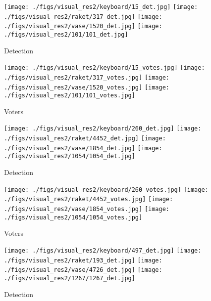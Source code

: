 \documentclass[runningheads]{llncs}
\begin{document}
\begin{figure*}
\captionsetup[subfigure]{labelformat=empty}
\centering
\begin{subfigure}[b]{0.16\textwidth}
   \caption{Detection}
   \texttt{[image: ./figs/visual\_res2/keyboard/15\_det.jpg]}
   \texttt{[image: ./figs/visual\_res2/raket/317\_det.jpg]}
   \texttt{[image: ./figs/visual\_res2/vase/1520\_det.jpg]}
   \texttt{[image: ./figs/visual\_res2/101/101\_det.jpg]}


\end{subfigure}
\begin{subfigure}[b]{0.16\textwidth}
   \caption{Voters}
   \texttt{[image: ./figs/visual\_res2/keyboard/15\_votes.jpg]}
\texttt{[image: ./figs/visual\_res2/raket/317\_votes.jpg]}
  \texttt{[image: ./figs/visual\_res2/vase/1520\_votes.jpg]}
   \texttt{[image: ./figs/visual\_res2/101/101\_votes.jpg]}
\end{subfigure}
\begin{subfigure}[b]{0.16\textwidth}
   \caption{Detection}
   \texttt{[image: ./figs/visual\_res2/keyboard/260\_det.jpg]}
   \texttt{[image: ./figs/visual\_res2/raket/4452\_det.jpg]}
   \texttt{[image: ./figs/visual\_res2/vase/1854\_det.jpg]}
   \texttt{[image: ./figs/visual\_res2/1054/1054\_det.jpg]}
\end{subfigure}
\begin{subfigure}[b]{0.16\textwidth}
   \caption{Voters}
   \texttt{[image: ./figs/visual\_res2/keyboard/260\_votes.jpg]}
\texttt{[image: ./figs/visual\_res2/raket/4452\_votes.jpg]}
  \texttt{[image: ./figs/visual\_res2/vase/1854\_votes.jpg]}
  \texttt{[image: ./figs/visual\_res2/1054/1054\_votes.jpg]}
\end{subfigure}
\begin{subfigure}[b]{0.16\textwidth}
   \caption{Detection}
   \texttt{[image: ./figs/visual\_res2/keyboard/497\_det.jpg]}
   \texttt{[image: ./figs/visual\_res2/raket/193\_det.jpg]}
   \texttt{[image: ./figs/visual\_res2/vase/4726\_det.jpg]}
  \texttt{[image: ./figs/visual\_res2/1267/1267\_det.jpg]}
\end{subfigure}
\begin{subfigure}[b]{0.16\textwidth}

\end{subfigure}
\end{figure*}
\end{document}
